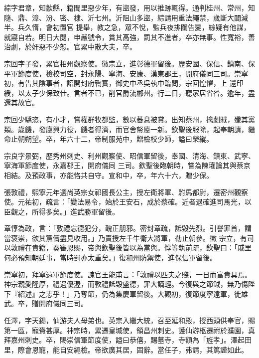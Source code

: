 \begin{pinyinscope}
 綜字君章，知歙縣，籍閭里惡少年，有盜發，用以推跡輒得。通判桂州、常州，知隨、鼎、漳、汾、密、棣、沂七州。沂阻山多盜，綜請用重法繩禁，歲斷大闢減半。兵久惰，會初置官
 提舉，教之急，眾不悅，監兵夜排闥告變，綜疑有他謀，就寢自若。明日大閱，申嚴號令，賞其高強，罰其不進者，卒亦無事。性寬裕，善治劇，於奸惡不少恕。官累中散大夫，卒。



 宗回字子發，累官相州觀察使。徽宗立，進彰德軍留後。歷安國、保信、鎮南、保平軍節度使，檢校司空，封永陽、寧海、安康、漢東郡王，開府儀同三司。崇寧初，有告其陰事者，詔開封府鞫實，御史中丞吳執中臨問，宗回惶懼，上
 還印綬，以太子少保致仕。言者不已，削官爵流郴州。行二日，聽家居省咎。逾年，盡還其故官。



 宗回少驕恣，有小才，嘗權群牧都監，數以蕃息被賞。出知蔡州，擒劇賊，殲其黨類。歲饑，發廩興力役，饑者得濟，而官舍帑廩一新。欽聖後服除，起奉朝請，繼命止朝朔望。卒，年六十二，帝制服苑中，贈檢校少師，謚曰榮縱。



 宗良字景弼，歷秀州刺史、利州觀察使、昭信軍留後，奉國、清海、鎮東、武寧、寧海軍節度使，永嘉郡王，開府儀同
 三司。欽聖後臨朝時，嘗為陳瓘論其與蔡京相結。及預政事，亦能恪共自守。宣和中，卒，年六十六，贈少保。



 張敦禮，熙寧元年選尚英宗女祁國長公主，授左衛將軍、駙馬都尉，遷密州觀察使。元祐初，疏言：「變法易令，始於王安石，成於蔡確。近者退確進司馬光，以臣觀之，所得多矣。」進武勝軍留後。



 章惇為政，言：「敦禮忘德犯分，醜正朋邪。密封章疏，詆毀先烈。引譽罪首，謂當褒崇，欲其黨儔盡見收用。」乃責授左千牛衛大將軍，勒止朝參。徽
 宗立，有司以敦禮在貴籍，奏審恩賜，帝與欽聖後皆以為當與。惇等執前疏，欽聖曰：「戚里何必預知朝廷事，當時罰亦太重矣。」復和州防禦使，進保信軍留後。



 崇寧初，拜寧遠軍節度使。諫官王能甫言：「敦禮以匹夫之賤，一日而富貴具焉。神宗親愛隆厚，禮遇優渥，而敦禮詆毀盛德，罪大謫輕。今復與之節鉞，無乃傷陛下『紹述』之志乎！」乃奪節，仍為集慶軍留後。大觀初，復節度寧遠軍，徙雄武。卒，贈開府儀同三司。



 任澤，字天錫，仙游夫人母弟也。英宗入繼大統，召至延和殿，授西頭供奉官，賜第一區，寵賚甚厚。神宗時，累遷皇城使，領昌州刺史。護仙游柩遷祔於濮園，真拜嘉州刺史。卒，賜崇信軍節度使，謚曰恭僖，賜墓寺，寺額為「旌孝」。澤起田里，際會恩寵，能自安繩檢。帝欲廣其居，固辭。當任子，弗請，其篤謹如此。



\end{pinyinscope}